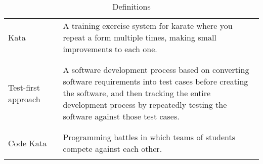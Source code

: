 \begin{table}[H]
\begin{tabular}{l l p{10cm}}
        Kata                & \vline & A training exercise system for karate where you repeat a form multiple times, making small improvements to each one.   \\
                            &        &                                                                                                                        \\\hline & & \\
        Test-first approach & \vline & A software development process based on converting software requirements into test cases before creating the software,
        and then tracking the entire development process by repeatedly testing the software against those test cases.                                         \\
                            &        &                                                                                                                        \\\hline & & \\
        Code Kata           & \vline & Programming battles in which teams of students compete against each other.                                             \\
                            &        &                                                                                                                        \\
        \hline
    \end{tabular}
    \caption{Definitions}
\end{table}

